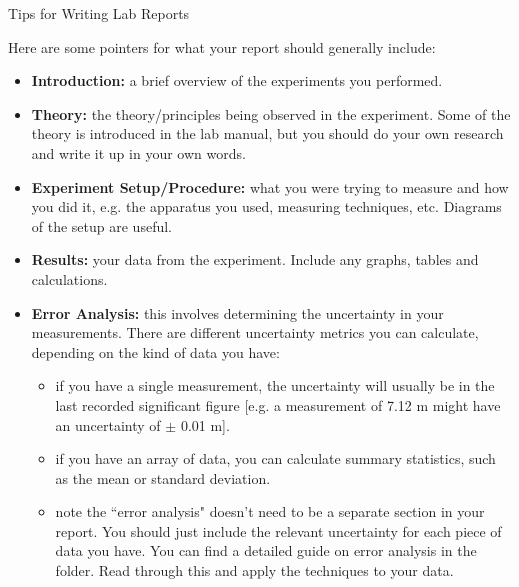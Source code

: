 \documentclass[11pt]{extarticle}
\begin{document}
\setlength{\parindent}{0pt}

\begin{center}
	\huge
	Tips for Writing Lab Reports

	\vspace{0.5cm}
\end{center}

Here are some pointers for what your report should generally include:

\hfill 

\begin{itemize}
	\item {\bf Introduction:} a brief overview of the experiments you performed. 

	\item {\bf Theory:} the theory/principles being observed in the experiment. Some of the theory is introduced in the lab manual, but you should do your own research and write it up in your own words. 

	\item {\bf Experiment Setup/Procedure:} what you were trying to measure and how you did it, e.g. the apparatus you used, measuring techniques, etc. Diagrams of the setup are useful. 

	\item {\bf Results:} your data from the experiment. Include any graphs, tables and calculations. 

	\item {\bf Error Analysis:} this involves determining the uncertainty in your measurements. There are different uncertainty metrics you can calculate, depending on the kind of data you have: 
		\begin{itemize}
			\item if you have a single measurement, the uncertainty will usually be in the last recorded significant figure [e.g. a measurement of 7.12 m might have an uncertainty of $\pm$ 0.01 m]. 
			\item if you have an array of data, you can calculate summary statistics, such as the mean or standard deviation. 
			\item note the ``error analysis" doesn't need to be a separate section in your report. You should just include the relevant uncertainty for each piece of data you have. You can find a detailed guide on error analysis in the folder. Read through this and apply the techniques to your data. 
		\end{itemize}


\end{itemize}
\end{document}
